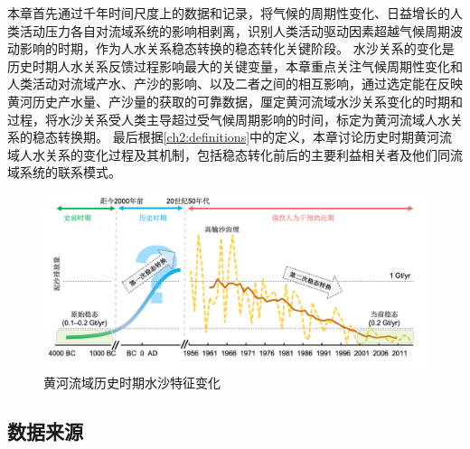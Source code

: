
本章首先通过千年时间尺度上的数据和记录，将气候的周期性变化、日益增长的人类活动压力各自对流域系统的影响相剥离，识别人类活动驱动因素超越气候周期波动影响的时期，作为人水关系稳态转换的稳态转化关键阶段。
水沙关系的变化是历史时期人水关系反馈过程影响最大的关键变量，本章重点关注气候周期性变化和人类活动对流域产水、产沙的影响、以及二者之间的相互影响，通过选定能在反映黄河历史产水量、产沙量的获取的可靠数据，厘定黄河流域水沙关系变化的时期和过程，将水沙关系受人类主导超过受气候周期影响的时间，标定为黄河流域人水关系的稳态转换期。
最后根据\ref{ch2:definitions}中的定义，本章讨论历史时期黄河流域人水关系的变化过程及其机制，包括稳态转化前后的主要利益相关者及他们同流域系统的联系模式。

\begin{figure}[!htb] %
    \centering
    \includegraphics[width=\textwidth]{img/ch3/ch3_why_regime_shift.png}
    \caption{黄河流域历史时期水沙特征变化}\label{fig:ch3:why_regime_shift}
\end{figure}

\subsection{数据来源}

